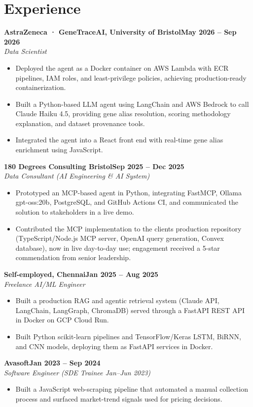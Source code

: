 \documentclass[a4paper,10pt]{article}
\newcommand{\entry}[4]{\noindent\textbf{#1}\hfill\textbf{#2}\\ \textit{#3}\hfill\textit{#4}\par}
\begin{document}
\section{Experience}
\entry{AstraZeneca · GeneTraceAI, University of Bristol}{May 2026 – Sep 2026}{Data Scientist}{}
\begin{itemize}
  \item Deployed the agent as a Docker container on AWS Lambda with ECR pipelines, IAM roles, and least-privilege policies, achieving production-ready containerization.
  \item Built a Python-based LLM agent using LangChain and AWS Bedrock to call Claude Haiku 4.5, providing gene alias resolution, scoring methodology explanation, and dataset provenance tools.
  \item Integrated the agent into a React front end with real-time gene alias enrichment using JavaScript.
\end{itemize}
\vspace{3pt}
\entry{180 Degrees Consulting Bristol}{Sep 2025 – Dec 2025}{Data Consultant (AI Engineering \& AI System)}{}
\begin{itemize}
  \item Prototyped an MCP-based agent in Python, integrating FastMCP, Ollama gpt-oss:20b, PostgreSQL, and GitHub Actions CI, and communicated the solution to stakeholders in a live demo.
  \item Contributed the MCP implementation to the client\textquotesingle{}s production repository (TypeScript/Node.js MCP server, OpenAI query generation, Convex database), now in live day-to-day use; engagement received a 5-star commendation from senior leadership.
\end{itemize}
\vspace{3pt}
\entry{Self-employed, Chennai}{Jan 2025 – Aug 2025}{Freelance AI/ML Engineer}{}
\begin{itemize}
  \item Built a production RAG and agentic retrieval system (Claude API, LangChain, LangGraph, ChromaDB) served through a FastAPI REST API in Docker on GCP Cloud Run.
  \item Built Python scikit-learn pipelines and TensorFlow/Keras LSTM, BiRNN, and CNN models, deploying them as FastAPI services in Docker.
\end{itemize}
\vspace{3pt}
\entry{Avasoft}{Jan 2023 – Sep 2024}{Software Engineer (SDE Trainee Jan–Jun 2023)}{}
\begin{itemize}
  \item Built a JavaScript web-scraping pipeline that automated a manual collection process and surfaced market-trend signals used for pricing decisions.
\end{itemize}
\end{document}

